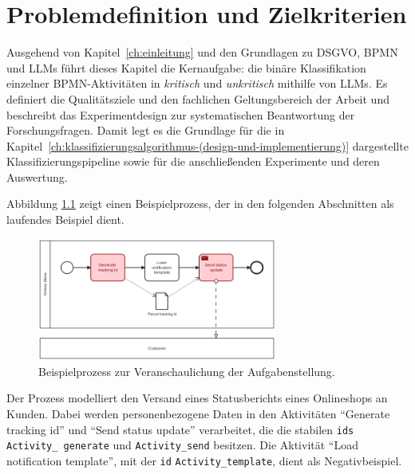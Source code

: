 \chapter{Problemdefinition und Zielkriterien}\label{ch:problemdefinition-und-zielkriterien}

Ausgehend von Kapitel~\ref{ch:einleitung} und den Grundlagen zu \ac{DSGVO}, \ac{BPMN} und \acp{LLM} führt dieses Kapitel die Kernaufgabe: die binäre Klassifikation einzelner \ac{BPMN}-Aktivitäten in \emph{kritisch} und \emph{unkritisch} mithilfe von \acp{LLM}. Es definiert die Qualitätsziele und den fachlichen Geltungsbereich der Arbeit und beschreibt das Experimentdesign zur systematischen Beantwortung der Forschungsfragen. Damit legt es die Grundlage für die in Kapitel~\ref{ch:klassifizierungsalgorithmus-(design-und-implementierung)} dargestellte Klassifizierungspipeline sowie für die anschließenden Experimente und deren Auswertung.

Abbildung \ref{fig:running_example} zeigt einen Beispielprozess, der in den folgenden Abschnitten als laufendes Beispiel dient.

\begin{figure}[h]
    \centering
    \includegraphics[width=0.7\textwidth]{images/running_example_en}
    \caption{Beispielprozess zur Veranschaulichung der Aufgabenstellung.}
    \label{fig:running_example}
\end{figure}

Der Prozess modelliert den Versand eines Statusberichts eines Onlineshops an Kunden. Dabei werden personenbezogene Daten in den Aktivitäten \enquote{Generate tracking id} und \enquote{Send status update} verarbeitet, die die stabilen \texttt{ids} \texttt{Activity\_\linebreak~generate} und \texttt{Activity\_send} besitzen. Die Aktivität \enquote{Load notification template}, mit der \texttt{id} \texttt{Activity\_template}, dient als Negativbeispiel.





